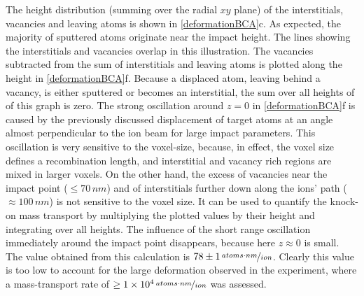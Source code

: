 The height distribution (summing over the radial $xy$ plane) of the interstitials, vacancies and leaving atoms is shown in \ref{deformationBCA}c. As expected, the majority of sputtered atoms originate near the impact height. The lines showing the interstitials and vacancies overlap in this illustration. The vacancies subtracted from the sum of interstitials and leaving atoms is plotted along the height in \ref{deformationBCA}f. Because a displaced atom, leaving behind a vacancy, is either sputtered or becomes an interstitial, the sum over all heights of of this graph is zero. The strong oscillation around $z=0$ in \ref{deformationBCA}f is caused by the previously discussed displacement of target atoms at an angle almost perpendicular to the ion beam for large impact parameters. This oscillation is very sensitive to the voxel-size, because, in effect, the voxel size defines a recombination length, and interstitial and vacancy rich regions are mixed in larger voxels. On the other hand, the excess of vacancies near the impact point ($\le 70\,nm$) and of interstitials further down along the ions' path ($\approx 100\,nm$) is not sensitive to the voxel size. It can be used to quantify the knock-on mass transport by multiplying the plotted values by their height and integrating over all heights. The influence of the short range oscillation immediately around the impact point disappears, because here $z \approx 0$ is small. The value obtained from this calculation is $78\pm1\,\nicefrac{atoms \cdot nm}{ion}$. Clearly this value is too low to account for the large deformation observed in the experiment, where a mass-transport rate of $\ge 1\times 10^{4}\,\nicefrac{atoms \cdot nm}{ion}$ was assessed.

